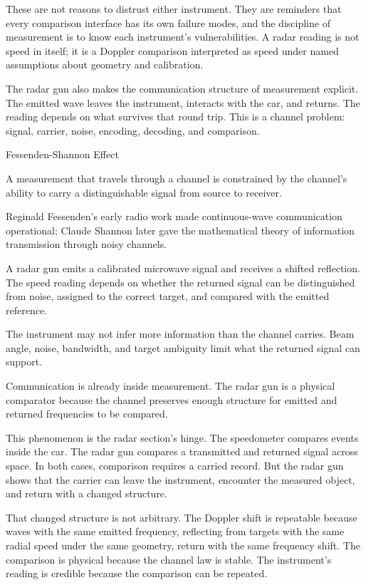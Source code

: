 These are not reasons to distrust either instrument. They are reminders that
every comparison interface has its own failure modes, and the discipline of
measurement is to know each instrument's vulnerabilities. A radar reading is
not speed in itself; it is a Doppler comparison interpreted as speed under
named assumptions about geometry and calibration.

The radar gun also makes the communication structure of measurement explicit.
The emitted wave leaves the instrument, interacts with the car, and returns. The
reading depends on what survives that round trip. This is a channel problem:
signal, carrier, noise, encoding, decoding, and comparison.

\begin{phenom}{Fessenden-Shannon Effect}
\label{ph:fessenden-shannon-effect}

\PhStatement A measurement that travels through a channel is constrained by the
channel's ability to carry a distinguishable signal from source to receiver.

\PhOrigin Reginald Fessenden's early radio work made continuous-wave
communication operational; Claude Shannon later gave the mathematical theory of
information transmission through noisy channels.

\PhObservation A radar gun emits a calibrated microwave signal and receives a
shifted reflection. The speed reading depends on whether the returned signal can
be distinguished from noise, assigned to the correct target, and compared with
the emitted reference.

\PhConstraint The instrument may not infer more information than the channel
carries. Beam angle, noise, bandwidth, and target ambiguity limit what the
returned signal can support.

\PhConsequence Communication is already inside measurement. The radar gun is a
physical comparator because the channel preserves enough structure for emitted
and returned frequencies to be compared.

\end{phenom}

This phenomenon is the radar section's hinge. The speedometer compares events
inside the car. The radar gun compares a transmitted and returned signal across
space. In both cases, comparison requires a carried record. But the radar gun
shows that the carrier can leave the instrument, encounter the measured object,
and return with a changed structure.

That changed structure is not arbitrary. The Doppler shift is repeatable because
waves with the same emitted frequency, reflecting from targets with the same
radial speed under the same geometry, return with the same frequency shift. The
comparison is physical because the channel law is stable. The instrument's
reading is credible because the comparison can be repeated.

